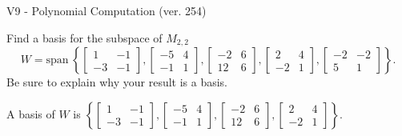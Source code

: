 \begin{exercise}
  \begin{exerciseTitle}V9 - Polynomial Computation (ver. 254)\end{exerciseTitle}
  \begin{exerciseStatement}
    Find a basis for the subspace of \(M_{2,2}\) 
\[W=\mathrm{span}\ \left\{\left[\begin{array}{cc}
1 & -1 \\
-3 & -1
\end{array}\right] , \left[\begin{array}{cc}
-5 & 4 \\
-1 & 1
\end{array}\right] , \left[\begin{array}{cc}
-2 & 6 \\
12 & 6
\end{array}\right] , \left[\begin{array}{cc}
2 & 4 \\
-2 & 1
\end{array}\right] , \left[\begin{array}{cc}
-2 & -2 \\
5 & 1
\end{array}\right]\right\}.\]
 Be sure to explain why your result is a basis.


  \end{exerciseStatement}
  \begin{exerciseAnswer}
   A basis of \(W\) is  \(\left\{\left[\begin{array}{cc}
1 & -1 \\
-3 & -1
\end{array}\right] , \left[\begin{array}{cc}
-5 & 4 \\
-1 & 1
\end{array}\right] , \left[\begin{array}{cc}
-2 & 6 \\
12 & 6
\end{array}\right] , \left[\begin{array}{cc}
2 & 4 \\
-2 & 1
\end{array}\right]\right\}\).
  


  \end{exerciseAnswer}
\end{exercise}